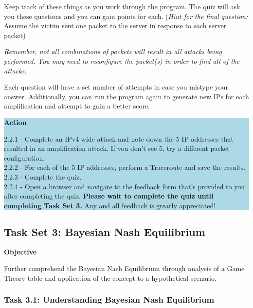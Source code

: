\documentclass[letterpaper,12pt]{report}
\begin{document}
Keep track of these things as you work through the program. The quiz will ask you these questions and you can gain points for each. (\textit{Hint for the final question:} Assume the victim sent one packet to the server in response to each server packet)

\textit{Remember, not all combinations of packets will result in all attacks being performed. You may need to reconfigure the packet(s) in order to find all of the attacks.}

Each question will have a set number of attempts in case you mistype your answer. Additionally, you can run the program again to generate new IPs for each amplification and attempt to gain a better score.

\colorbox{lightblue}{%
\parbox{\dimexpr\linewidth-2\fboxsep}{%
\textbf{Action}

2.2.1 - Complete an IPv4 wide attack and note down the 5 IP addresses that resulted in an amplification attack. If you don't see 5, try a different packet configuration. \\ 
2.2.2 - For each of the 5 IP addresses, perform a Traceroute and save the results. \\
2.2.3 - Complete the quiz. \\
2.2.4 - Open a browser and navigate to the feedback form that's provided to you after completing the quiz. \textbf{Please wait to complete the quiz until completing Task Set 3.} Any and all feedback is greatly appreciated!\\ 
    }%
}%


\subsection*{Task Set 3: Bayesian Nash Equilibrium }\label{sec:Task-Set-3}

\textbf{Objective}

Further comprehend the Bayesian Nash Equilibrium through analysis of a Game Theory table and application of the concept to a hypothetical scenario.

\subsubsection*{Task 3.1: Understanding Bayesian Nash Equilibrium}\label{sec:Task-3.1-Understanding-Bayesian-Nash-Equilibrium}
\end{document}
